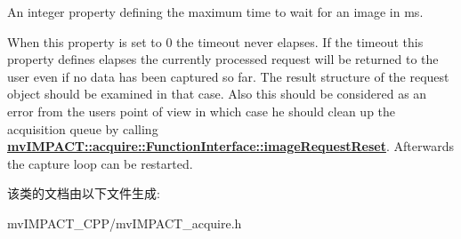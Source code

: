 An integer property defining the maximum time to wait for an image in ms. 

When this property is set to 0 the timeout never elapses. If the timeout this property defines elapses the currently processed request will be returned to the user even if no data has been captured so far. The result structure of the request object should be examined in that case. Also this should be considered as an error from the users point of view in which case he should clean up the acquisition queue by calling {\bfseries \hyperlink{classmv_i_m_p_a_c_t_1_1acquire_1_1_function_interface_a234b2c6e31f3e83629501da47095c54f}{mv\+I\+M\+P\+A\+C\+T\+::acquire\+::\+Function\+Interface\+::image\+Request\+Reset}}. Afterwards the capture loop can be restarted. 

该类的文档由以下文件生成\+:\begin{DoxyCompactItemize}
\item 
mv\+I\+M\+P\+A\+C\+T\+\_\+\+C\+P\+P/mv\+I\+M\+P\+A\+C\+T\+\_\+acquire.\+h\end{DoxyCompactItemize}

